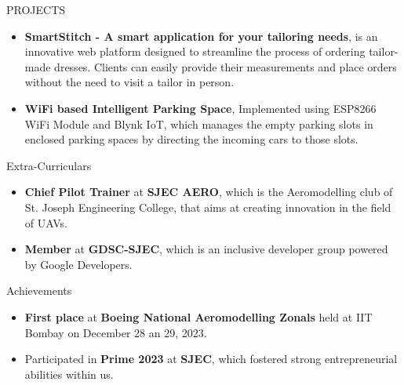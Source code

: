 \documentclass{resume} %
\begin{document}

\begin{rSection}{PROJECTS}
\begin{itemize}
\item \textbf{SmartStitch - A smart application for your tailoring needs}{, is an innovative web platform designed to streamline the process of ordering tailor-made dresses. Clients can easily provide their measurements and place orders without the need to visit a tailor in person.}
\item \textbf{WiFi based Intelligent Parking Space}{, Implemented using ESP8266 WiFi Module and Blynk IoT, which manages the empty parking slots in enclosed parking spaces by directing the incoming cars to those slots.}
\end{itemize}

\end{rSection}

\begin{rSection}{Extra-Curriculars} 
    \begin{itemize}
        \item 	\textbf{Chief Pilot Trainer} at \textbf{SJEC AERO}, which is the Aeromodelling club of St. Joseph Engineering College, that aims at creating innovation in the field of UAVs.
        \item	\textbf{Member} at \textbf{GDSC-SJEC}, which is an inclusive developer group powered by Google Developers.
    
    \end{itemize}
    
    
    \end{rSection}

\begin{rSection}{Achievements} 
    \begin{itemize}
        \item 	\textbf{First place} at \textbf{Boeing National Aeromodelling Zonals} held at IIT Bombay on December 28 an 29, 2023.
    \item Participated in \textbf{Prime 2023} at \textbf{SJEC}, which fostered strong entrepreneurial abilities within us.
    \end{itemize}
    
    
    \end{rSection}
\end{document}

